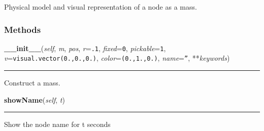     \label{Epigrass:dgraph:Node}
Physical model and visual representation of a node as a mass.



  \subsubsection{Methods}

    \label{Epigrass:dgraph:Node:__init__}

    \vspace{0.5ex}

    \begin{boxedminipage}{\textwidth}

    \raggedright \textbf{\_\_init\_\_}(\textit{self}, \textit{m}, \textit{pos}, \textit{r}=\texttt{.1}, \textit{fixed}=\texttt{0}, \textit{pickable}=\texttt{1}, \textit{v}=\texttt{visual.vector(0.,0.,0.)}, \textit{color}=\texttt{(0.,1.,0.)}, \textit{name}=\texttt{''}, **\textit{keywords})

    \vspace{-1.5ex}

    \rule{\textwidth}{0.5\fboxrule}
    Construct a mass.

    \vspace{1ex}

    \end{boxedminipage}

    \label{Epigrass:dgraph:Node:showName}

    \vspace{0.5ex}

    \begin{boxedminipage}{\textwidth}

    \raggedright \textbf{showName}(\textit{self}, \textit{t})

    \vspace{-1.5ex}

    \rule{\textwidth}{0.5\fboxrule}
    Show the node name for t seconds

    \vspace{1ex}

    \end{boxedminipage}

